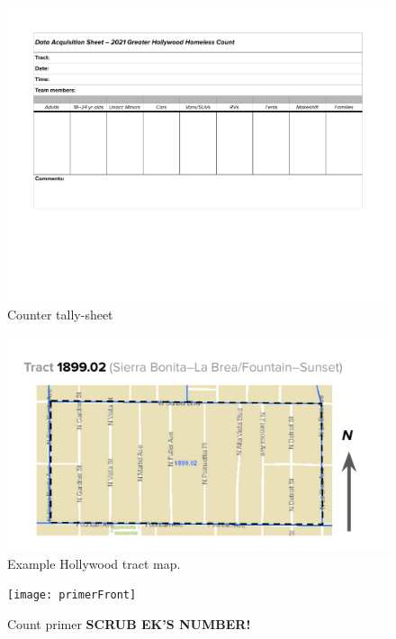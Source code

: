 \documentclass[11pt,twocolumn]{article}
\def\bfr{\bf\color{red}}
\begin{document}
\begin{figure}
	\centering
	\includegraphics[width =\linewidth]{Hollywood2021CountDataSheet}
	\caption{Counter tally-sheet}
\end{figure}

\begin{figure}
	\centering
	\includegraphics[width =\linewidth]{tractMap}
	\caption{Example Hollywood tract map.}
\end{figure}

\begin{figure}
	\centering
	\texttt{[image: primerFront]}
	\caption{Count primer {\bfr SCRUB EK'S NUMBER!}}
\end{figure}
\end{document}
